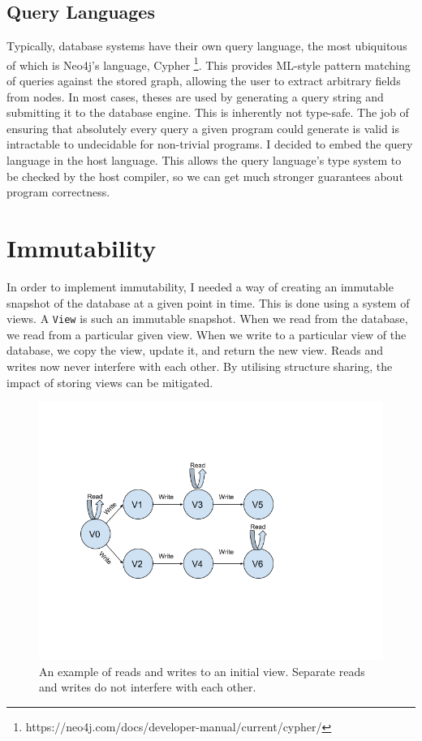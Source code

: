 \documentclass[12pt,a4paper,twoside,openright]{report}
\newcommand\codeName[1]{\texttt{#1}}
\begin{document}
\subsection{Query Languages}
Typically, database systems have their own query language, the most ubiquitous of which is Neo4j's language, Cypher \footnote{https://neo4j.com/docs/developer-manual/current/cypher/}. This provides ML-style pattern matching of queries against the stored graph, allowing the user to extract arbitrary fields from nodes. In most cases, theses are used by generating a query string and submitting it to the database engine. This is inherently not type-safe. The job of ensuring that absolutely every query a given program could generate is valid is intractable to undecidable for non-trivial programs. I decided to embed the query language in the host language. This allows the query language's type system to be checked by the host compiler, so we can get much stronger guarantees about program correctness.

\section{Immutability}\label{immutability}
In order to implement immutability, I needed a way of creating an immutable snapshot of the database at a given point in time. This is done using a system of views. A \codeName{View} is such an immutable snapshot. When we read from the database, we read from a particular given view. When we write to a particular view of the database, we copy the view, update it, and return the new view. Reads and writes now never interfere with each other. By utilising structure sharing, the impact of storing views can be mitigated.

\begin{figure}[ht]
\centering
  \includegraphics[width=\textwidth]{figs/readsWrites.png}
  \caption{An example of reads and writes to an initial view. Separate reads and writes do not interfere with each other.}
  \label{fig:ReadsWrites}
\end{figure}
\end{document}

